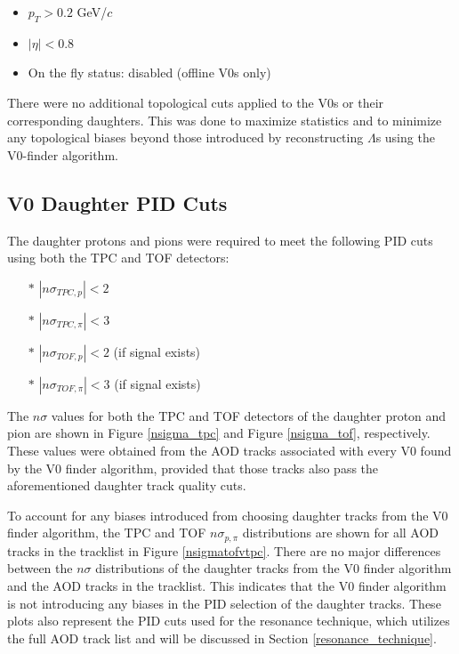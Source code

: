 \documentclass[ALICE,manyauthors]{ALICE_analysis_notes}
\begin{document}
\begin{itemize}
\begin{itemize}
	\item $p_{T} > 0.2$ GeV/$c$
	\item $|\eta| < 0.8$
	\item On the fly status: disabled (offline V0s only)
\end{itemize}

There were no additional topological cuts applied to the V0s or their corresponding daughters. This was done to maximize statistics and to minimize any topological biases beyond those introduced by reconstructing $\Lambda$s using the V0-finder algorithm.

\subsection{V0 Daughter PID Cuts}
\label{v0_daughter_pid}
The daughter protons and pions were required to meet the following PID cuts using both the TPC and TOF detectors:

\begin{itemize}
	\item[$\ast$] $|n\sigma_{TPC, p}| < 2$
	\item[$\ast$] $|n\sigma_{TPC, \pi}| < 3$
	\item[$\ast$] $|n\sigma_{TOF, p}| < 2$ (if signal exists)
	\item[$\ast$] $|n\sigma_{TOF, \pi}| < 3$ (if signal exists)
\end{itemize}

The $n\sigma$ values for both the TPC and TOF detectors of the daughter proton and pion are shown in Figure \ref{nsigma_tpc} and Figure \ref{nsigma_tof}, respectively. These values were obtained from the AOD tracks associated with every V0 found by the V0 finder algorithm, provided that those tracks also pass the aforementioned daughter track quality cuts.

To account for any biases introduced from choosing daughter tracks from the V0 finder algorithm, the TPC and TOF $n\sigma_{p, \pi}$ distributions are shown for all AOD tracks in the tracklist in Figure \ref{nsigmatofvtpc}. There are no major differences between the $n\sigma$ distributions of the daughter tracks from the V0 finder algorithm and the AOD tracks in the tracklist. This indicates that the V0 finder algorithm is not introducing any biases in the PID selection of the daughter tracks. These plots also represent the PID cuts used for the resonance technique, which utilizes the full AOD track list and will be discussed in Section \ref{resonance_technique}.



\end{itemize}
\end{document}
